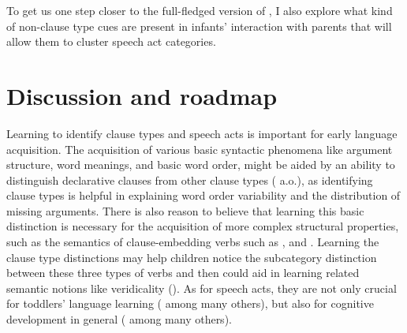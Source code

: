
To get us one step closer to the full-fledged version of \hypos{}, I also explore what kind of non-clause type cues are present in infants' interaction with parents that will allow them to cluster speech act categories. 




\section{Discussion and roadmap}
\label{sec:intro:roadmap}

Learning to identify clause types and speech acts is important for early language acquisition. The acquisition of various basic syntactic phenomena like argument structure, word meanings, and basic word order, might be aided by an ability to distinguish declarative clauses from other clause types (\citealt{pinker1984, pinker1989, gleitman1990, frankgoldwaterfrank2013, perkins2019} a.o.), as identifying clause types is helpful in explaining word order variability and the distribution of missing arguments. There is also reason to believe that learning this basic distinction is necessary for the acquisition of more complex structural properties, such as the semantics of clause-embedding verbs such as ,  and . Learning the clause type distinctions may help children notice the subcategory distinction between these three types of verbs and then could aid in learning related semantic notions like veridicality (\citealt{white2015diss, lewis2017think,dudley2017,hacquardlidz2018}). As for speech acts, they are not only crucial for toddlers' language learning (\citealt{ninio1980, hoff1985cds,yoder1994,rowland2003cdswh, valian2003cds, rowe2017wh, gaudreau2020q, gaudreau2021question} among many others), but also for cognitive development in general (\citealt{hohmann1995educating} among many others). 

